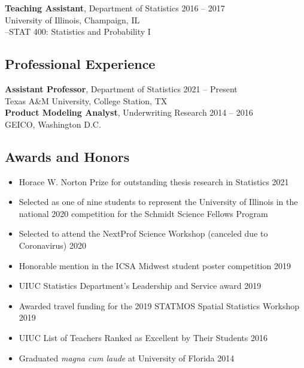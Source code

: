 \documentclass[11pt]{article}
\begin{document}
\noindent \textbf{Teaching Assistant}, Department of Statistics \hfill 2016 -- 2017 \\
University of Illinois, Champaign, IL \vspace{0.1cm} \\
--STAT 400: Statistics and Probability I


\subsection*{Professional Experience}
\vspace{-0.6cm}\noindent\hrulefill
\vspace{0.1cm}

\noindent \textbf{Assistant Professor}, Department of Statistics \hfill 2021 -- Present \\
Texas A\&M University, College Station, TX \\

\noindent \textbf{Product Modeling Analyst}, Underwriting Research \hfill 2014 -- 2016 \\
GEICO, Washington D.C.


\subsection*{Awards and Honors}
\vspace{-0.6cm}\noindent\hrulefill
\vspace{-0.2cm}

\begin{itemize}[leftmargin=*,label={}]
    \setlength\itemsep{-0.2em}
    \item Horace W. Norton Prize for outstanding thesis research in Statistics  \hfill 2021
    \item Selected as one of nine students to represent the University of Illinois in the national  \hfill 2020  competition for the Schmidt Science Fellows Program
        
    
    \item Selected to attend the NextProf Science Workshop (canceled due to Coronavirus) \hfill 2020
  
    \item Honorable mention in the ICSA Midwest student poster competition \hfill 2019

    \item UIUC Statistics Department's Leadership and Service award \hfill 2019
    
    \item Awarded travel funding for the 2019 STATMOS Spatial Statistics Workshop \hfill 2019
    
    \item UIUC List of Teachers Ranked as Excellent by Their Students \hfill 2016
    
    \item Graduated \textit{magna cum laude} at University of Florida \hfill 2014
\end{itemize}
\end{document}
